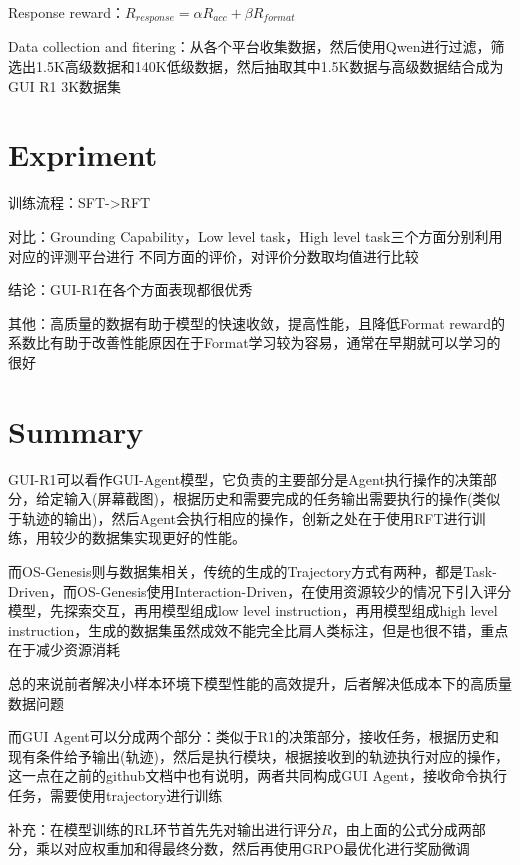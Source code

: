 \documentclass[a4paper,12pt]{article}
\begin{document}
Response reward：$R_{response} = \alpha R_{acc} + \beta R_{format}$

Data collection and fitering：从各个平台收集数据，然后使用Qwen进行过滤，筛选出1.5K高级数据和140K低级数据，然后抽取其中1.5K数据与高级数据结合成为GUI R1 3K数据集

\section{Expriment}
训练流程：SFT->RFT

对比：Grounding Capability，Low level task，High level task三个方面分别利用对应的评测平台进行 不同方面的评价，对评价分数取均值进行比较

结论：GUI-R1在各个方面表现都很优秀

其他：高质量的数据有助于模型的快速收敛，提高性能，且降低Format reward的系数比有助于改善性能原因在于Format学习较为容易，通常在早期就可以学习的很好

\section{Summary}
GUI-R1可以看作GUI-Agent模型，它负责的主要部分是Agent执行操作的决策部分，给定输入(屏幕截图)，根据历史和需要完成的任务输出需要执行的操作(类似于轨迹的输出)，然后Agent会执行相应的操作，创新之处在于使用RFT进行训练，用较少的数据集实现更好的性能。

而OS-Genesis则与数据集相关，传统的生成的Trajectory方式有两种，都是Task-Driven，而OS-Genesis使用Interaction-Driven，在使用资源较少的情况下引入评分模型，先探索交互，再用模型组成low level instruction，再用模型组成high level instruction，生成的数据集虽然成效不能完全比肩人类标注，但是也很不错，重点在于减少资源消耗

总的来说前者解决小样本环境下模型性能的高效提升，后者解决低成本下的高质量数据问题

而GUI Agent可以分成两个部分：类似于R1的决策部分，接收任务，根据历史和现有条件给予输出(轨迹)，然后是执行模块，根据接收到的轨迹执行对应的操作，这一点在之前的github文档中也有说明，两者共同构成GUI Agent，接收命令执行任务，需要使用trajectory进行训练

补充：在模型训练的RL环节首先先对输出进行评分$R$，由上面的公式分成两部分，乘以对应权重加和得最终分数，然后再使用GRPO最优化进行奖励微调
\end{document}
